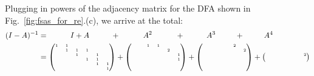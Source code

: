 \documentclass[sigplan,review,acmsmall,nonacm,screen,anonymous]{acmart}\settopmatter{printfolios=false,printccs=false,printacmref=false}
\begin{document}
\noindent Plugging in powers of the adjacency matrix for the DFA shown in Fig.~\ref{fig:fsas_for_re}.(c), we arrive at the total:
\begin{align}
(I-A)^{-1} &= \hspace{1cm}I + A \hspace{1cm}+\hspace{1.05cm} A^2 \hspace{1.07cm}+\hspace{1cm} A^3 \hspace{0.9cm}+\hspace{0.9cm} A^4\\
  &=\begin{tiny}\begin{pmatrix}
       1 & 1 &   &   &   &   \\
        & 1  & 1 & 1 &   &   \\
        &   & 1  &   & 1 &   \\
        &   &   & 1  & 1 &   \\
        &   &   &   & 1  & 1 \\
        &   &   &   &   & 1  \\
  \end{pmatrix} + \begin{pmatrix}
              &   & 1 & 1 &   &   \\
              &   &   &   & 2 &   \\
              &   &   &   &   & 1 \\
              &   &   &   &   & 1 \\
              &   &   &   &   &   \\
              &   &   &   &   &   \\
  \end{pmatrix} + \begin{pmatrix}
              &   &   &   & 2 &   \\
              &   &   &   &   & 2 \\
              &   &   &   &   &   \\
              &   &   &   &   &   \\
              &   &   &   &   &   \\
              &   &   &   &   &   \\
  \end{pmatrix} + \begin{pmatrix}
              &   &   &   &   & 2 \\
              &   &   &   &   &   \\

\end{pmatrix}
\end{tiny}
\end{align}
\end{document}
